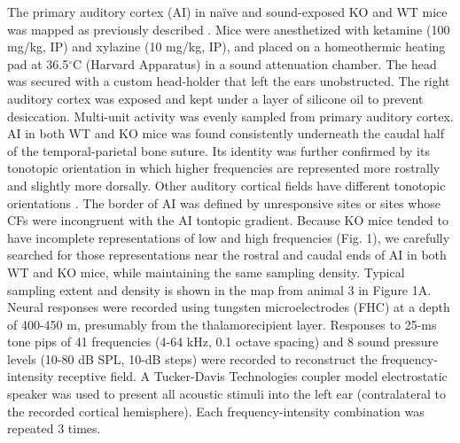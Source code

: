 The primary auditory cortex (AI) in na\"ive and sound-exposed KO and WT mice was mapped as previously described \cite{Kim2009}. Mice were anesthetized with ketamine (100 mg/kg, IP) and xylazine (10 mg/kg, IP), and placed on a homeothermic heating pad at 36.5$^\circ$C (Harvard Apparatus) in a sound attenuation chamber. The head was secured with a custom head-holder that left the ears unobstructed. The right auditory cortex was exposed and kept under a layer of silicone oil to prevent desiccation. Multi-unit activity was evenly sampled from primary auditory cortex. AI in both WT and KO mice was found consistently underneath the caudal half of the temporal-parietal bone suture. Its identity was further confirmed by its tonotopic orientation in which higher frequencies are represented more rostrally and slightly more dorsally. Other auditory cortical fields have different tonotopic orientations \cite{Guo2012}. The border of AI was defined by unresponsive sites or sites whose CFs were incongruent with the AI tontopic gradient. Because KO mice tended to have incomplete representations of low and high frequencies (Fig. 1), we carefully searched for those representations near the rostral and caudal ends of AI in both WT and KO mice, while maintaining the same sampling density. Typical sampling extent and density is shown in the map from animal 3 in Figure 1A. Neural responses were recorded using tungsten microelectrodes (FHC) at a depth of 400-450 \textmu m, presumably from the thalamorecipient layer. Responses to 25-ms tone pips of 41 frequencies (4-64 kHz, 0.1 octave spacing) and 8 sound pressure levels (10-80 dB SPL, 10-dB steps) were recorded to reconstruct the frequency-intensity receptive field. A Tucker-Davis Technologies coupler model electrostatic speaker was used to present all acoustic stimuli into the left ear (contralateral to the recorded cortical hemisphere). Each frequency-intensity combination was repeated 3 times.

